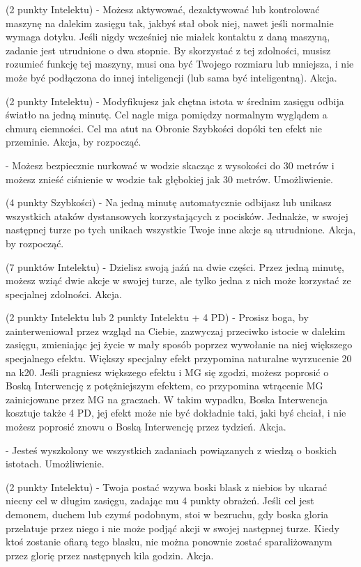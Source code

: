 { (2 punkty Intelektu) - Możesz aktywować, dezaktywować lub kontrolować maszynę na dalekim zasięgu tak, jakbyś stał obok niej, nawet jeśli normalnie wymaga dotyku. Jeśli nigdy wcześniej nie miałek kontaktu z daną maszyną, zadanie jest utrudnione o dwa stopnie. By skorzystać z tej zdolności, musisz rozumieć funkcję tej maszyny, musi ona być Twojego rozmiaru lub mniejsza, i nie może być podłączona do innej inteligencji (lub sama być inteligentną). Akcja. 

 (2 punkty Intelektu) - Modyfikujesz jak chętna istota w średnim zasięgu odbija światło na jedną minutę. Cel nagle miga pomiędzy normalnym wyglądem a chmurą ciemności. Cel ma atut na Obronie Szybkości dopóki ten efekt nie przeminie. Akcja, by rozpocząć. 

 - Możesz bezpiecznie nurkować w wodzie skacząc z wysokości do 30 metrów i możesz znieść ciśnienie w wodzie tak głębokiej jak 30 metrów. Umożliwienie.

 (4 punkty Szybkości) - Na jedną minutę automatycznie odbijasz lub unikasz wszystkich ataków dystansowych korzystających z pocisków. Jednakże, w swojej następnej turze po tych unikach wszystkie Twoje inne akcje są utrudnione. Akcja, by rozpocząć. 

 (7 punktów Intelektu) - Dzielisz swoją jaźń na dwie części. Przez jedną minutę, możesz wziąć dwie akcje w swojej turze, ale tylko jedna z nich może korzystać ze specjalnej zdolności. Akcja. 

 (2 punkty Intelektu lub 2 punkty Intelektu + 4 PD) - Prosisz boga, by zainterweniował przez wzgląd na Ciebie, zazwyczaj przeciwko istocie w dalekim zasięgu, zmieniając jej życie w mały sposób poprzez wywołanie na niej większego specjalnego efektu. Większy specjalny efekt przypomina naturalne wyrzucenie 20 na k20. Jeśli pragniesz większego efektu i MG się zgodzi, możesz poprosić o Boską Interwencję z potężniejszym efektem, co przypomina wtrącenie MG zainicjowane przez MG na graczach. W takim wypadku, Boska Interwencja kosztuje także 4 PD, jej efekt może nie być dokładnie taki, jaki byś chciał, i nie możesz poprosić znowu o Boską Interwencję przez tydzień. Akcja. 

 - Jesteś wyszkolony we wszystkich zadaniach powiązanych z wiedzą o boskich istotach. Umożliwienie. 

 (2 punkty Intelektu) - Twoja postać wzywa boski blask z niebios by ukarać niecny cel w długim zasięgu, zadając mu 4 punkty obrażeń. Jeśli cel jest demonem, duchem lub czymś podobnym, stoi w bezruchu, gdy boska gloria przelatuje przez niego i nie może podjąć akcji w swojej następnej turze. Kiedy ktoś zostanie ofiarą tego blasku, nie można ponownie zostać sparaliżowanym przez glorię przez następnych kila godzin. Akcja. 

}
